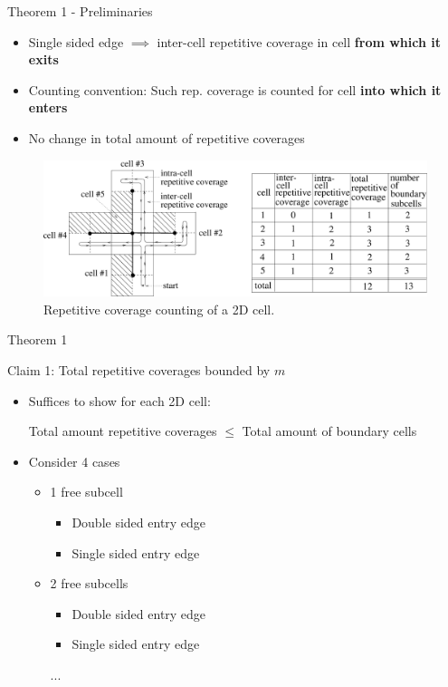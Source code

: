 \documentclass{beamer}
\begin{document}
\begin{frame}{Theorem 1 - Preliminaries}
    \begin{itemize}
        \item Single sided edge $\implies$ inter-cell repetitive coverage in cell \textbf{from which it exits}
        \item Counting convention: Such rep. coverage is counted for cell \textbf{into which it enters}
        \item No change in total amount of repetitive coverages
    \end{itemize}
    \begin{figure}
        \includegraphics[width=0.8\linewidth]{Images/inv_fig9.png}
        \caption{Repetitive coverage counting of a 2D cell.}
    \end{figure}
\end{frame}


\begin{frame}{Theorem 1}
    \begin{block}{Claim 1: Total repetitive coverages bounded by $m$}
        \begin{itemize}
            \item Suffices to show for each 2D cell:

                  Total amount repetitive coverages $\leq$ Total amount of boundary cells
            \item Consider 4 cases
                  \begin{itemize}
                      \item 1 free subcell
                            \begin{itemize}
                                \item Double sided entry edge
                                \item Single sided entry edge
                            \end{itemize}
                      \item 2 free subcells
                            \begin{itemize}
                                \item Double sided entry edge
                                \item Single sided entry edge
                            \end{itemize}
                            ...
                  \end{itemize}
        \end{itemize}
    \end{block}
\end{frame}
\end{document}
